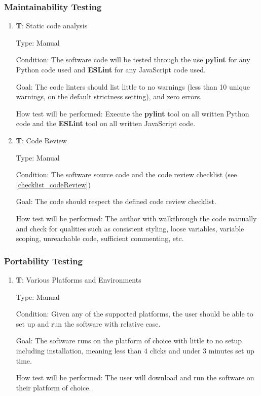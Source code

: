 \documentclass[12pt, titlepage]{article}
\newcounter{testnum} %
\begin{document}
\subsubsection{Maintainability Testing}
\begin{enumerate}

  \item{\textbf{T\thetestnum \label{T_linters}}: Static code analysis\\}

  Type: Manual
            
  Condition: The software code will be tested through the use \textbf{pylint} for any
    Python code used and \textbf{ESLint} for any JavaScript code used.
            
  Goal: The code linters should list little to no 
    warnings (less than 10 unique warnings, on the default strictness setting), and zero errors.
            
  How test will be performed: Execute the \textbf{pylint} tool on all written Python code and 
    the \textbf{ESLint} tool on all written JavaScript code.

  \item{\textbf{T\thetestnum \label{T_codeReview}}: Code Review\\}

  Type: Manual
            
  Condition: The software source code and the code review checklist (see \ref{checklist_codeReview})
            
  Goal: The code should respect the defined code review checklist.
            
  How test will be performed: The author with walkthrough the code manually and check for qualities
    such as consistent styling, loose variables, variable scoping, unreachable code, 
    sufficient commenting, etc.
  
\end{enumerate}

\subsubsection{Portability Testing}
\begin{enumerate}

  \item{\textbf{T\thetestnum \label{T_portability}}: Various Platforms and Environments\\}

  Type: Manual
            
  Condition: Given any of the supported platforms, the user should be able to set up and 
    run the software with relative ease.
            
  Goal: The software runs on the platform of choice with little to no setup including 
    installation, meaning less than 4 clicks and under 3 minutes set up time.
            
  How test will be performed: The user will download and run the software on their
    platform of choice.
  
\end{enumerate}
\end{document}

